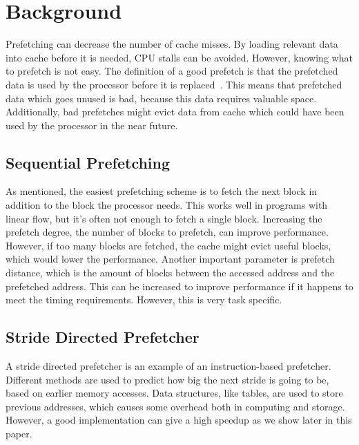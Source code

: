 \section{Background} %



Prefetching can decrease the number of cache misses. By loading
relevant data into cache before it is needed, CPU stalls can be
avoided. However, knowing what to prefetch is not easy. The definition
of a good prefetch is that the prefetched data is used by the
processor before it is
replaced~\cite{srinivasan_davidson_tyson_2004}. This means that
prefetched data which goes unused is bad, because this data requires
valuable space. Additionally, bad prefetches might evict data from
cache which could have been used by the processor in the near future.

\subsection{Sequential Prefetching}

As mentioned, the easiest prefetching scheme is to fetch the next
block in addition to the block the processor needs. This works well in
programs with linear flow, but it's often not enough to fetch a single
block. Increasing the prefetch degree, the number of blocks to
prefetch, can improve performance. However, if too many blocks are
fetched, the cache might evict useful blocks, which would lower the
performance. Another important parameter is prefetch distance, which
is the amount of blocks between the accessed address and the
prefetched address. This can be increased to improve performance if it
happens to meet the timing requirements. However, this is very task
specific.

\subsection{Stride Directed Prefetcher}

A stride directed prefetcher is an example of an instruction-based
prefetcher. Different methods are used to predict how big the next
stride is going to be, based on earlier memory accesses. Data
structures, like tables, are used to store previous addresses, which
causes some overhead both in computing and storage. However, a good
implementation can give a high speedup as we show later in this paper.

